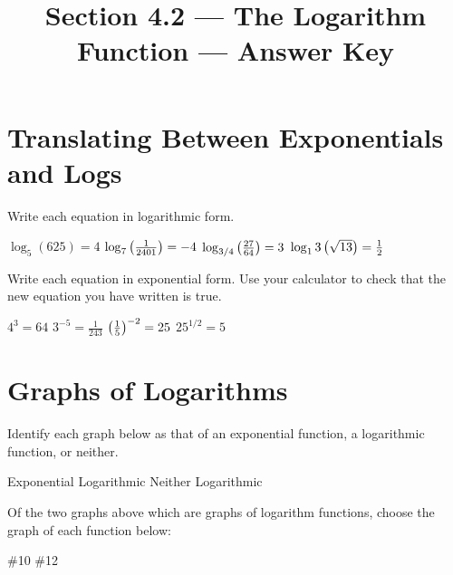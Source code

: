 

\title{Section 4.2 --- The Logarithm Function --- Answer Key}

\NewDocumentCommand{\DomRng}{m d(] d[)}{%
$\dom #1=%
\IfNoValueTF{#2}{%
\IfNoValueTF{#3}{%
\eint
}{
\lint{#3}
}}{
\rint{#2}
}$\\$\rng #1=\eint$}


\maketitle

\section*{Translating Between Exponentials and Logs}
Write each equation in logarithmic form.
\begin{smenum}
\mitemxxxx
{$\log_5(625)=4$}
{$\log_7\left(\frac{1}{2401}\right)=-4$}
{$\log_{3/4}\left(\frac{27}{64}\right)=3$}
{$\log_13\left(\sqrt{13}\right)=\frac{1}{2}$}
\end{smenum}
Write each equation in exponential form.  Use your calculator to check that the new equation you have written is true.
\begin{smenum}
\mitemxxxx
{$4^3=64$}
{$3^{-5}=\frac{1}{243}$}
{$\left(\frac{1}{5}\right)^{-2}=25$}
{$25^{1/2}=5$}
\end{smenum}

\section*{Graphs of Logarithms}
Identify each graph below as that of an exponential function, a logarithmic function, or neither.
\begin{smenum}
\mitemxxxx
{Exponential}
{Logarithmic}
{Neither}
{Logarithmic}
\end{smenum}
Of the two graphs above which are graphs of logarithm functions, choose the graph of each function below:
\begin{smenum}
\mitemxx
{\#10}
{\#12}
\end{smenum}

